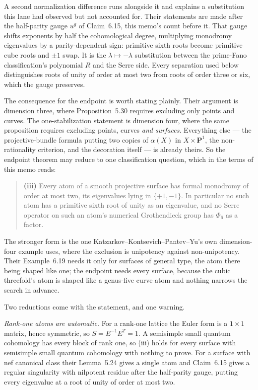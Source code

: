 \documentclass[11pt]{article}
\theoremstyle{definition}
\theoremstyle{remark}
\newcommand{\PP}{\mathbf P}
\begin{document}
A second normalization difference runs alongside it and explains a substitution
this lane had observed but not accounted for. Their statements are made after the
half-parity gauge $u^g$ of Claim~6.15, this memo's count before it. That gauge
shifts exponents by half the cohomological degree, multiplying monodromy
eigenvalues by a parity-dependent sign: primitive sixth roots become primitive
cube roots and $\pm1$ swap. It is the $\lambda\mapsto-\lambda$ substitution
between the prime-Fano classification's polynomial $R$ and the Serre side. Every
separation used below distinguishes roots of unity of order at most two from
roots of order three or six, which the gauge preserves.

The consequence for the endpoint is worth stating plainly. Their argument is
dimension three, where Proposition~5.30 requires excluding only points and
curves. The one-stabilization statement is dimension four, where the same
proposition requires excluding points, curves \emph{and surfaces}. Everything
else --- the projective-bundle formula putting two copies of $\alpha(X)$ in
$X\times\PP^1$, the non-rationality criterion, and the decoration itself ---
is already theirs. So the endpoint theorem may reduce to one classification
question, which in the terms of this memo reads:

\begin{quote}
\textbf{(iii)} Every atom of a smooth projective surface has formal monodromy of
order at most two, its eigenvalues lying in $\{+1,-1\}$. In particular no such
atom has a primitive sixth root of unity as an eigenvalue, and no Serre operator
on such an atom's numerical Grothendieck group has $\Phi_6$ as a factor.
\end{quote}

The stronger form is the one Katzarkov--Kontsevich--Pantev--Yu's own dimension-four
example uses, where the exclusion is unipotency against non-unipotency. Their
Example~6.19 needs it only for surfaces of general type, the atom there being
shaped like one; the endpoint needs every surface, because the cubic threefold's
atom is shaped like a genus-five curve atom and nothing narrows the search in
advance.

Two reductions come with the statement, and one warning.

\emph{Rank-one atoms are automatic.} For a rank-one lattice the Euler form is a
$1\times1$ matrix, hence symmetric, so $S=E^{-1}E^T=1$. A semisimple small
quantum cohomology has every block of rank one, so (iii) holds for every surface
with semisimple small quantum cohomology with nothing to prove. For a surface
with nef canonical class their Lemma~5.24 gives a single atom and Claim~6.15
gives a regular singularity with nilpotent residue after the half-parity gauge,
putting every eigenvalue at a root of unity of order at most two.
\end{document}
